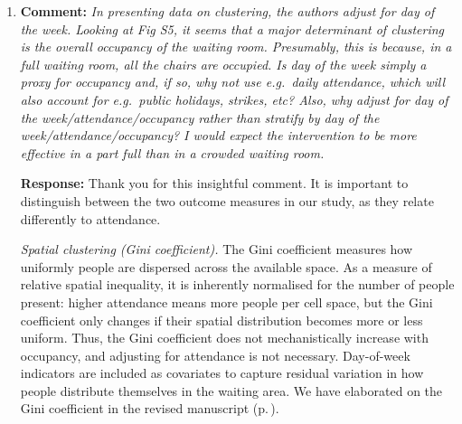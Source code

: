 \documentclass[11pt]{article}
\newcommand{\comment}[1]{\textbf{Comment:} \textit{#1}}
\newcommand{\response}[1]{\textbf{Response:} #1}
\begin{document}
\begin{enumerate}[label=\textbf{R2.\arabic*.}, leftmargin=*]
{That said, we believe that our assumptions do not invalidate the estimated intervention effects. The intervention effects are computed in relative terms as changes in the ratio of infections between a Wells-Riley model with and without the spatial component. While our assumptions may certainly affect the precision of absolute risk estimates, relative comparisons are more robust, as systematic biases from ignoring airflow patterns would affect both the numerator and denominator similarly. Furthermore, we emphasise that the purpose of our study is to assess and quantify the \textit{potential} of crowding-reduction interventions to lower \emph{Mtb} transmission risk using a modelling framework specifically designed to incorporate spatial proximity. It is \underline{not} an experimental airflow study aimed at precisely estimating absolute infection risk under full consideration of all environmental factors. We have revised the manuscript to make this distinction clearer and to temper claims accordingly.

Regarding generalisability: we agree that air mixing conditions are likely to differ between facilities, e.g. depending on room geometry, ventilation infrastructure, and occupancy patterns. However, the qualitative finding that reducing operational interventions to reduce spatial clustering can lower proximity-dependent \emph{Mtb} exposure should hold across settings, even if the magnitude of the effect will vary.}

\item\label{r:2.4} \comment{In presenting data on clustering, the authors adjust for day of the week. Looking at Fig S5, it seems that a major determinant of clustering is the overall occupancy of the waiting room. Presumably, this is because, in a full waiting room, all the chairs are occupied. Is day of the week simply a proxy for occupancy and, if so, why not use e.g.\ daily attendance, which will also account for e.g.\ public holidays, strikes, etc? Also, why adjust for day of the week/attendance/occupancy rather than stratify by day of the week/attendance/occupancy? I would expect the intervention to be more effective in a part full than in a crowded waiting room.}

\response{Thank you for this insightful comment. It is important to distinguish between the two outcome measures in our study, as they relate differently to attendance.

\textit{Spatial clustering (Gini coefficient).} The Gini coefficient measures how uniformly people are dispersed across the available space. As a measure of relative spatial inequality, it is inherently normalised for the number of people present: higher attendance means more people per cell space, but the Gini coefficient only changes if their spatial distribution becomes more or less uniform. Thus, the Gini coefficient does not mechanistically increase with occupancy, and adjusting for attendance is not necessary. Day-of-week indicators are included as covariates to capture residual variation in how people distribute themselves in the waiting area. We have elaborated on the Gini coefficient in the revised manuscript (p.\,\pageref{chg:R2.5}).

}
\end{enumerate}
\end{document}
